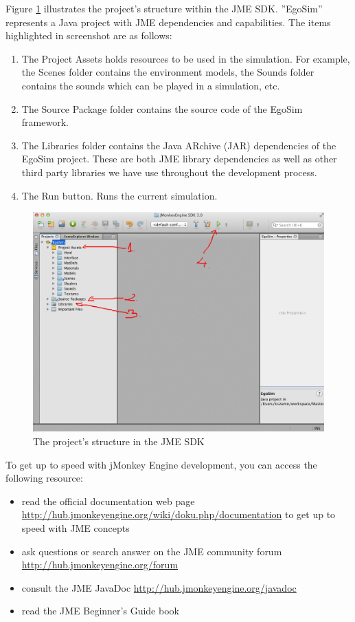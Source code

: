 Figure \ref{fig:egosim_structure} illustrates the project's structure within the JME SDK. ''EgoSim'' represents a Java project with JME dependencies and capabilities. The items highlighted in screenshot are as follows:
\begin{enumerate}
	\item The Project Assets holds resources to be used in the simulation. For example, the Scenes folder contains the environment models, the Sounds folder contains the sounds which can be played in a simulation, etc.
	\item The Source Package folder contains the source code of the EgoSim framework.
	\item The Libraries folder contains the Java ARchive (JAR) dependencies of the EgoSim project. These are both JME library dependencies as well as other third party libraries we have use throughout the development process.
	\item The Run button. Runs the current simulation.
\end{enumerate}

\begin{figure}[H]
	\centering
	\includegraphics[width=\linewidth]{gfx/Chapter4/project_structure_in_sdk}
	\caption{The project's structure in the JME SDK}
	\label{fig:egosim_structure}
\end{figure}

To get up to speed with jMonkey Engine development, you can access the following resource:
\begin{itemize}
	\item read the official documentation web page \url{http://hub.jmonkeyengine.org/wiki/doku.php/documentation} to get up to speed with JME concepts
	\item ask questions or search answer on the JME community forum \url{http://hub.jmonkeyengine.org/forum}
	\item consult the JME JavaDoc \url{http://hub.jmonkeyengine.org/javadoc}
	\item read the JME Beginner's Guide book \cite{kusterer2013jmonkeyengine}
\end{itemize}

